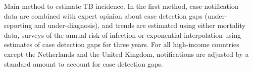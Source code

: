 Main method to estimate TB incidence. In the first method, case notification data are combined with expert opinion about case detection gaps (under-reporting and under-diagnosis), and trends are estimated using either mortality data, surveys of the annual risk of infection or exponential interpolation using estimates of case detection gaps for three years. For all high-income countries except the Netherlands and the United Kingdom, notifications are adjusted by a standard amount to account for case detection gaps. 